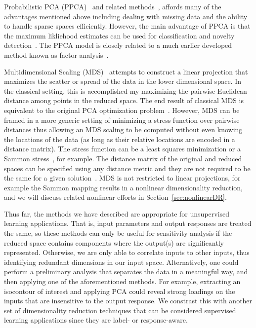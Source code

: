 Probabilistic PCA (PPCA)~\cite{TippingBishop1999} and related methods~\cite{Roweis1998,WellingAgakovWilliams2003,WilliamsAgakov2002}, affords many of the advantages mentioned above including dealing with missing data and the ability to handle sparse spaces efficiently.
%
However, the main advantage of PPCA is that the maximum likliehood estimates can be used for classification and novelty detection~\cite{TippingBishop1999}.
%
The PPCA model is closely related to a much earlier developed method known as factor analysis~\cite{Spearman1904b}.

Multidimensional Scaling (MDS)~\cite{BorgGroenen2005,CoxCox2000,Torgerson1952} attempts to construct a linear projection that maximizes the scatter or spread of the data in the lower dimensional space.
%
In the classical setting, this is accomplished my maximizing the pairwise Euclidean distance among points in the reduced space.
%
The end result of classical MDS is equivalent to the original PCA optimization problem~\cite{BorgGroenen2005,CoxCox2000,MardiaKentBibby1979,Williams2002}.
%
However, MDS can be framed in a more generic setting of minimizing a stress function over pairwise distances thus allowing an MDS scaling to be computed without even knowing the locations of the data (as long as their relative locations are encoded in a distance matrix).
%
The stress function can be a least squares minimization or a Sammon stress~\cite{Sammon1969}, for example.
%
The distance matrix of the original and reduced spaces can be specified using any distance metric and they are not required to be the same for a given solution~\cite{CunninghamGhahramani2015}.
%
MDS is not restricted to linear projections, for example the Sammon mapping results in a nonlinear dimensionality reduction, and we will discuss related nonlinear efforts in Section~\ref{sec:nonlinearDR}.

Thus far, the methods we have described are appropriate for unsupervised learning applications.
%
That is, input parameters and output responses are treated the same, so these methods can only be useful for sensitivity analysis if the reduced space contains components where the output(s) are significantly represented.
%
Otherwise, we are only able to correlate inputs to other inputs, thus identifying redundant dimensions in our input space.
%
Alternatively, one could perform a preliminary analysis that separates the data in a meaningful way, and then applying one of the aforementioned methods.
%
For example, extracting an isocontour of interest and applying PCA could reveal strong loadings on the inputs that are insensitive to the output response.
%
We constrast this with another set of dimensionality reduction techniques that can be considered supervised learning applications since they are label- or response-aware.

